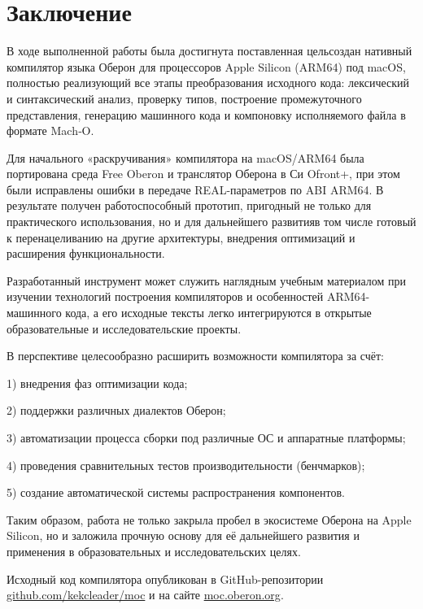 \documentclass[utf8]{lgu}
\newcommand{\tire}{\unskip\nobreak\thinspace\textemdash\thinspace}
\begin{document}
\section*{Заключение}

В ходе выполненной работы была достигнута поставленная цель\tire создан нативный компилятор языка Оберон для процессоров Apple Silicon (ARM64) под macOS, полностью реализующий все этапы преобразования исходного кода: лексический и синтаксический анализ, проверку типов, построение промежуточного представления, генерацию машинного кода и компоновку исполняемого файла в формате Mach‑O.

Для начального «раскручивания» компилятора на macOS/ARM64 была портирована среда Free Oberon и транслятор Оберона в Си Ofront+, при этом были исправлены ошибки в передаче REAL-параметров по ABI ARM64. В результате получен работоспособный прототип, пригодный не только для практического использования, но и для дальнейшего развития\tire в том числе готовый к перенацеливанию на другие архитектуры, внедрения оптимизаций и расширения функциональности.

Разработанный инструмент может служить наглядным учебным материалом при изучении технологий построения компиляторов и особенностей ARM64-машинного кода, а его исходные тексты легко интегрируются в открытые образовательные и исследовательские проекты.

В перспективе целесообразно расширить возможности компилятора за счёт:

1) внедрения фаз оптимизации кода;

2) поддержки различных диалектов Оберон;

3) автоматизации процесса сборки под различные ОС и аппаратные платформы;

4) проведения сравнительных тестов производительности (бенчмарков);

5) создание автоматической системы распространения компонентов.

Таким образом, работа не только закрыла пробел в экосистеме Оберона на Apple Silicon, но и заложила прочную основу для её дальнейшего развития и применения в образовательных и исследовательских целях.

Исходный код компилятора опубликован в GitHub-репозитории \href{https://github.com/kekcleader/moc}{github.com/kekcleader/moc}
и на сайте
\href{https://moc.oberon.org}{moc.oberon.org}.


\clearpage{}
\end{document}
